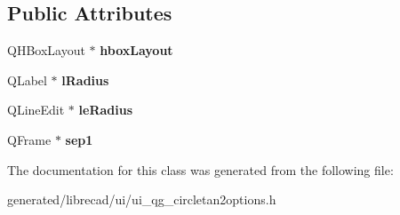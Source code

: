 \subsection*{Public Attributes}
\begin{DoxyCompactItemize}
\item 
\hypertarget{classUi__QG__CircleTan2Options_ae2c582241dda534f6f1ed89872715661}{Q\-H\-Box\-Layout $\ast$ {\bfseries hbox\-Layout}}\label{classUi__QG__CircleTan2Options_ae2c582241dda534f6f1ed89872715661}

\item 
\hypertarget{classUi__QG__CircleTan2Options_a49a2ccfd4a27be3d66ac199372a4f873}{Q\-Label $\ast$ {\bfseries l\-Radius}}\label{classUi__QG__CircleTan2Options_a49a2ccfd4a27be3d66ac199372a4f873}

\item 
\hypertarget{classUi__QG__CircleTan2Options_aedae66ec8332a48118170a680f659e24}{Q\-Line\-Edit $\ast$ {\bfseries le\-Radius}}\label{classUi__QG__CircleTan2Options_aedae66ec8332a48118170a680f659e24}

\item 
\hypertarget{classUi__QG__CircleTan2Options_a2d025f08a96502e3a3850ac0167799b0}{Q\-Frame $\ast$ {\bfseries sep1}}\label{classUi__QG__CircleTan2Options_a2d025f08a96502e3a3850ac0167799b0}

\end{DoxyCompactItemize}


The documentation for this class was generated from the following file\-:\begin{DoxyCompactItemize}
\item 
generated/librecad/ui/ui\-\_\-qg\-\_\-circletan2options.\-h\end{DoxyCompactItemize}
